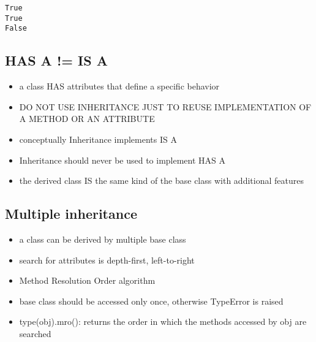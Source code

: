 \documentclass[11pt]{article}
\providecommand{\tightlist}{%
      \setlength{\itemsep}{0pt}\setlength{\parskip}{0pt}}
\begin{document}
    \begin{Verbatim}[commandchars=\\\{\}]
True
True
False
    \end{Verbatim}

    \hypertarget{has-a-is-a}{%
\subsection{HAS A != IS A}\label{has-a-is-a}}

\begin{itemize}
\tightlist
\item
  a class HAS attributes that define a specific behavior
\item
  DO NOT USE INHERITANCE JUST TO REUSE IMPLEMENTATION OF A METHOD OR AN
  ATTRIBUTE
\item
  conceptually Inheritance implements IS A
\item
  Inheritance should never be used to implement HAS A
\item
  the derived class IS the same kind of the base class with additional
  features
\end{itemize}

    \hypertarget{multiple-inheritance}{%
\subsection{Multiple inheritance}\label{multiple-inheritance}}

\begin{itemize}
\tightlist
\item
  a class can be derived by multiple base class
\item
  search for attributes is depth-first, left-to-right
\item
  Method Resolution Order algorithm
\item
  base class should be accessed only once, otherwise TypeError is raised
\item
  type(obj).mro(): returns the order in which the methods accessed by
  obj are searched
\end{itemize}
\end{document}

